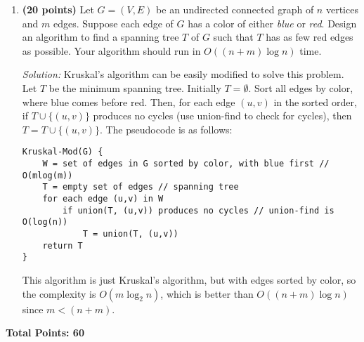 \documentclass[11pt]{article}
\begin{document}
\begin{enumerate}
\begin{enumerate}
\item
Suppose we increase the weight of every edge of $G$ by a positive value $\delta>0$. Then, is $\pi(s,t)$ still a shortest path from $s$ to $t$?
{\hfill \bf (10 points)}

\textit{Solution:} Not necessarily. Consider a graph with the following paths: $a,b,c,d,e,f$ where each edge in the path has weight $1$, and $a,f$, where the single edge has a weight of $10$. Clearly, the shortest path from $a$ to $f$ is $a,b,c,d,e,f$, with a total weight of $5$. Now imagine we increase the weight of each edge by $\delta=5$. Now the path $a,b,c,d,e,f$ has a total weight of $25$, while the path $a,f$ now has weight of $15$, making it the new shortest path from $a$ to $f$.

\item
Suppose we increase the weight of every edge of $G$ by a positive value $\delta>0$. Then, is $T$ still a minimum spanning tree of $G$?
{\hfill \bf (10 points)}

\textit{Solution:} Yes. The reason for part (a) not being true is that there may be several paths from $s$ to $t$, each with a different amount of edges. However, a minimum spanning tree always has $n-1$ edges, and so modifying each edge by any positive value of $\delta$ will maintain the same set of minimum spanning trees.

\end{enumerate}

\item
{\bf (20 points)}
Let $G=(V,E)$ be an undirected connected graph of $n$ vertices and $m$ edges. Suppose each edge of $G$ has a color of either {\em blue} or {\em red}. Design an algorithm to
find a spanning tree $T$ of $G$ such that $T$ has as few red edges as possible. Your algorithm should run in $O((n+m)\log n)$ time. 

\textit{Solution:} Kruskal's algorithm can be easily modified to solve this problem. Let $T$ be the minimum spanning tree. Initially $T=\emptyset$. Sort all edges by color, where blue comes before red. Then, for each edge $(u,v)$ in the sorted order, if $T \cup\{(u,v)\}$ produces no cycles (use union-find to check for cycles), then $T=T\cup \{(u,v)\}$. The pseudocode is as follows:
\begin{verbatim}
Kruskal-Mod(G) {
    W = set of edges in G sorted by color, with blue first // O(mlog(m))
    T = empty set of edges // spanning tree
    for each edge (u,v) in W
        if union(T, (u,v)) produces no cycles // union-find is O(log(n))
            T = union(T, (u,v))
    return T
}
\end{verbatim}
This algorithm is just Kruskal's algorithm, but with edges sorted by color, so the complexity is $O(m\log_2n)$, which is better than $O((n+m)\log n)$ since $m < (n+m)$.
\end{enumerate}
{\bf Total Points: 60}
\end{document}
